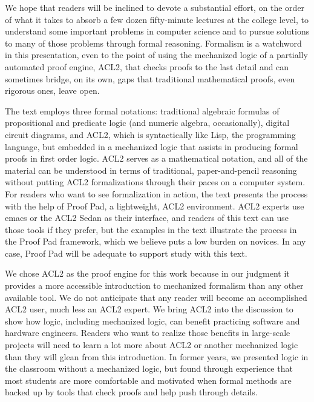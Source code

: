 We hope that readers will be inclined
to devote a substantial effort, on the order
of what it takes to absorb a few dozen fifty-minute
lectures at the college level,
to understand some important problems in computer science and
to pursue solutions to many of those problems through formal reasoning.
Formalism is a watchword in this presentation, even to the
point of using the mechanized logic of a partially automated proof engine,
ACL2, that checks proofs to the last detail and can sometimes
bridge, on its own, gaps that traditional mathematical
proofs, even rigorous ones, leave open.

The text employs three formal notations:
traditional algebraic formulas of propositional and predicate logic
(and numeric algebra, occasionally),
digital circuit diagrams, and ACL2, which is syntactically
like Lisp, the programming language, but embedded
in a mechanized logic that assists in producing
formal proofs in first order logic.
ACL2 serves as a mathematical notation, and all
of the material can be understood in terms of
traditional, paper-and-pencil reasoning
without putting ACL2 formalizations
through their paces on a computer system.
For readers who want to see formalization
in action, the text presents the process with
the help of Proof Pad, a lightweight, ACL2 environment.
ACL2 experts use emacs or the ACL2 Sedan
as their interface, and readers of this text can
use those tools if they prefer, but the examples in the text
illustrate the process in the Proof Pad framework,
which we believe puts a low burden on novices.
In any case, Proof Pad will be adequate to support
study with this text.

We chose ACL2 as the proof engine for this work
because in our judgment it provides a more accessible
introduction to mechanized formalism than any other
available tool. We do not anticipate that any
reader will become an accomplished ACL2 user,
much less an ACL2 expert. We bring ACL2 into the discussion
to show how logic, including mechanized logic,
can benefit practicing software and hardware engineers.
Readers who want to realize those benefits in
large-scale projects will need to learn a lot more
about ACL2 or another mechanized logic than they
will glean from this introduction.
In former years, we presented logic in the classroom
without a mechanized logic, but found through experience
that most students are more comfortable and motivated
when formal methods are backed up by tools
that check proofs and help
push through details.

